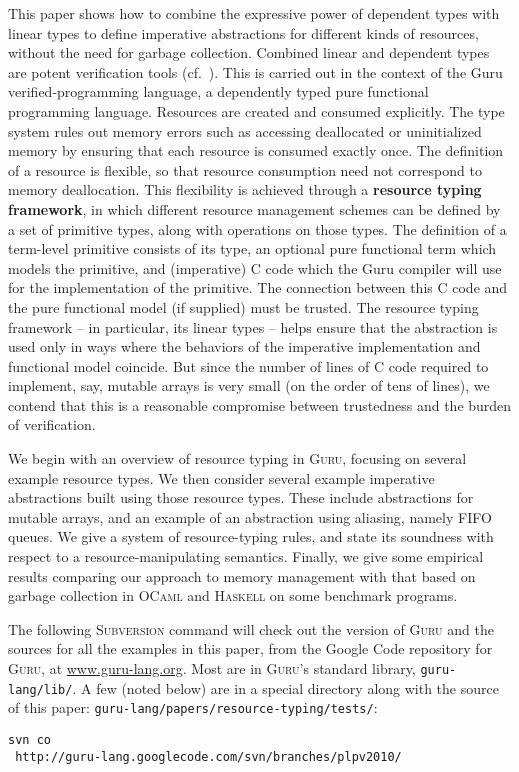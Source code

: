 \documentclass[9pt,natbib]{sigplanconf}
\begin{document}
This paper shows how to combine the expressive power of dependent
types with linear types to define imperative abstractions for
different kinds of resources, without the need for garbage collection.
Combined linear and dependent types are potent verification tools
(cf.~\cite{swamy+09,zhu+05}).  This is carried out in the context of
the Guru verified-programming language, a dependently typed pure
functional programming language.  Resources are created and consumed
explicitly.  The type system rules out memory errors such as accessing
deallocated or uninitialized memory by ensuring that each resource is
consumed exactly once.  The definition of a resource is flexible, so
that resource consumption need not correspond to memory deallocation.
This flexibility is achieved through a \textbf{resource typing
  framework}, in which different resource management schemes can be
defined by a set of primitive types, along with operations on those
types.  The definition of a term-level primitive consists of its type,
an optional pure functional term which models the primitive, and
(imperative) C code which the Guru compiler will use for the
implementation of the primitive.  The connection between this C code and
the pure functional model (if supplied) must be trusted.  The resource
typing framework -- in particular, its linear types -- helps ensure
that the abstraction is used only in ways where the behaviors of the
imperative implementation and functional model coincide.  But since
the number of lines of C code required to implement, say, mutable
arrays is very small (on the order of tens of lines), we contend that
this is a reasonable compromise between trustedness and the burden of
verification.

We begin with an overview of resource typing in \textsc{Guru},
focusing on several example resource types.  We then consider several
example imperative abstractions built using those resource types.
These include abstractions for mutable arrays, and an example of an
abstraction using aliasing, namely FIFO queues.  We give a system of
resource-typing rules, and state its soundness with respect to a
resource-manipulating semantics.  Finally, we give some empirical
results comparing our approach to memory management with that based on
garbage collection in \textsc{OCaml} and \textsc{Haskell} on some
benchmark programs.

The following \textsc{Subversion} command will check out the version
of \textsc{Guru} and the sources for all the examples in this paper,
from the Google Code repository for \textsc{Guru}, at
\url{www.guru-lang.org}.  Most are in \textsc{Guru}'s standard
library, \texttt{guru-lang/lib/}.  A few (noted below) are in a
special directory along with the source of this paper:
\texttt{guru-lang/papers/resource-typing/tests/}:
{\footnotesize
\begin{verbatim}
svn co
 http://guru-lang.googlecode.com/svn/branches/plpv2010/ 
\end{verbatim}
}
\end{document}
